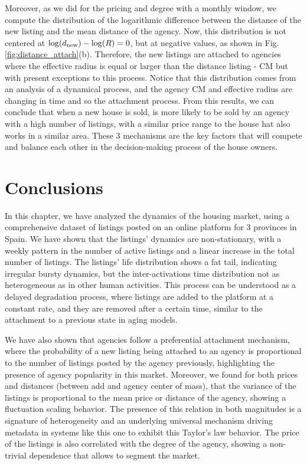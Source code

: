 Moreover, as we did for the pricing and degree with a monthly window, we compute the distribution of the logarithmic difference between the distance of the new listing and the mean distance of the agency. Now, this distribution is not centered at $\log(d_{\rm new}) - \log(R) = 0$, but at negative values, as shown in Fig. \ref{fig:distance_attach}(b). Therefore, the new listings are attached to agencies where the effective radius is equal or larger than the distance listing - CM but with present exceptions to this process. Notice that this distribution comes from an analysis of a dynamical process, and the agency CM and effective radius are changing in time and so the attachment process. From this results, we can conclude that when a new house is sold, is more likely to be sold by an agency with a high number of listings, with a similar price range to the house hat also works in a similar area. These 3 mechanisms are the key factors that will compete and balance each other in the decision-making process of the house owners.

\section{Conclusions}

In this chapter, we have analyzed the dynamics of the housing market, using a comprehensive dataset of listings posted on an online platform for 3 provinces in Spain. We have shown that the listings' dynamics are non-stationary, with a weekly pattern in the number of active listings and a linear increase in the total number of listings. The listings' life distribution shows a fat tail, indicating irregular bursty dynamics, but the inter-activations time distribution not as heterogeneous as in other human activities. This process can be understood as a delayed degradation process, where listings are added to the platform at a constant rate, and they are removed after a certain time, similar to the attachment to a previous state in aging models. 

We have also shown that agencies follow a preferential attachment mechanism, where the probability of a new listing being attached to an agency is proportional to the number of listings posted by the agency previously, highlighting the presence of agency popularity in this market. Moreover, we found for both prices and distances (between add and agency center of mass), that the variance of the listings is proportional to the mean price or distance of the agency, showing a fluctuation scaling behavior. The presence of this relation in both magnitudes is a signature of heterogeneity and an underlying universal mechanism driving metadata in systems like this one to exhibit this Taylor's law behavior. The price of the listings is also correlated with the degree of the agency, showing a non-trivial dependence that allows to segment the market. 

